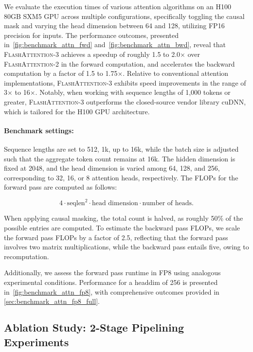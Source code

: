 \begin{enumerate}
\begin{algorithm}[H]
\begin{algorithmic}[1]
\begin{itemize}
We evaluate the execution times of various attention algorithms on an H100 80GB SXM5 GPU across multiple configurations, specifically toggling the causal mask and varying the head dimension between 64 and 128, utilizing FP16 precision for inputs. The performance outcomes, presented in~\cref{fig:benchmark_attn_fwd} and~\cref{fig:benchmark_attn_bwd}, reveal that \textsc{FlashAttention-3} achieves a speedup of roughly 1.5 to 2.0$\times$ over \textsc{FlashAttention-2} in the forward computation, and accelerates the backward computation by a factor of 1.5 to 1.75$\times$. Relative to conventional attention implementations, \textsc{FlashAttention-3} exhibits speed improvements in the range of 3$\times$ to 16$\times$. Notably, when working with sequence lengths of 1,000 tokens or greater, \textsc{FlashAttention-3} outperforms the closed-source vendor library cuDNN, which is tailored for the H100 GPU architecture.

\paragraph{Benchmark settings:} Sequence lengths are set to 512, 1k, up to 16k, while the batch size is adjusted such that the aggregate token count remains at 16k. The hidden dimension is fixed at 2048, and the head dimension is varied among 64, 128, and 256, corresponding to 32, 16, or 8 attention heads, respectively. The FLOPs for the forward pass are computed as follows:

\begin{equation*}
  4 \cdot \text{seqlen}^2 \cdot \text{head dimension} \cdot \text{number of heads}.
\end{equation*}

When applying causal masking, the total count is halved, as roughly 50\% of the possible entries are computed. To estimate the backward pass FLOPs, we scale the forward pass FLOPs by a factor of 2.5, reflecting that the forward pass involves two matrix multiplications, while the backward pass entails five, owing to recomputation.

Additionally, we assess the forward pass runtime in FP8 using analogous experimental conditions. Performance for a headdim of 256 is presented in~\cref{fig:benchmark_attn_fp8}, with comprehensive outcomes provided in \cref{sec:benchmark_attn_fp8_full}.

\subsection{Ablation Study: 2-Stage Pipelining Experiments}
\label{sec:2-stage-pipelining-experiments}


\end{itemize}
\end{algorithmic}
\end{algorithm}
\end{enumerate}
